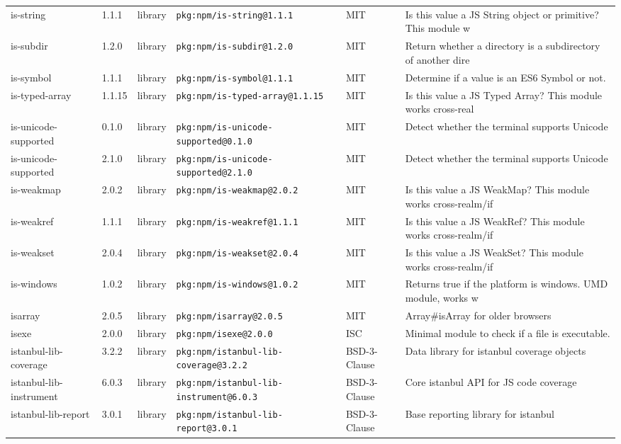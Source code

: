 \documentclass[11pt]{article}
\begin{document}
\begin{longtable}{|l|l|l|p{2.2cm}|l|p{4cm}|}
is-string & 1.1.1 & library & \texttt{pkg:npm/is-string@1.1.1} & MIT & Is this value a JS String object or primitive? This module w \\
is-subdir & 1.2.0 & library & \texttt{pkg:npm/is-subdir@1.2.0} & MIT & Return whether a directory is a subdirectory of another dire \\
is-symbol & 1.1.1 & library & \texttt{pkg:npm/is-symbol@1.1.1} & MIT & Determine if a value is an ES6 Symbol or not. \\
is-typed-array & 1.1.15 & library & \texttt{pkg:npm/is-typed-array@1.1.15} & MIT & Is this value a JS Typed Array? This module works cross-real \\
is-unicode-supported & 0.1.0 & library & \texttt{pkg:npm/is-unicode-supported@0.1.0} & MIT & Detect whether the terminal supports Unicode \\
is-unicode-supported & 2.1.0 & library & \texttt{pkg:npm/is-unicode-supported@2.1.0} & MIT & Detect whether the terminal supports Unicode \\
is-weakmap & 2.0.2 & library & \texttt{pkg:npm/is-weakmap@2.0.2} & MIT & Is this value a JS WeakMap? This module works cross-realm/if \\
is-weakref & 1.1.1 & library & \texttt{pkg:npm/is-weakref@1.1.1} & MIT & Is this value a JS WeakRef? This module works cross-realm/if \\
is-weakset & 2.0.4 & library & \texttt{pkg:npm/is-weakset@2.0.4} & MIT & Is this value a JS WeakSet? This module works cross-realm/if \\
is-windows & 1.0.2 & library & \texttt{pkg:npm/is-windows@1.0.2} & MIT & Returns true if the platform is windows. UMD module, works w \\
isarray & 2.0.5 & library & \texttt{pkg:npm/isarray@2.0.5} & MIT & Array\#isArray for older browsers \\
isexe & 2.0.0 & library & \texttt{pkg:npm/isexe@2.0.0} & ISC & Minimal module to check if a file is executable. \\
istanbul-lib-coverage & 3.2.2 & library & \texttt{pkg:npm/istanbul-lib-coverage@3.2.2} & BSD-3-Clause & Data library for istanbul coverage objects \\
istanbul-lib-instrument & 6.0.3 & library & \texttt{pkg:npm/istanbul-lib-instrument@6.0.3} & BSD-3-Clause & Core istanbul API for JS code coverage \\
istanbul-lib-report & 3.0.1 & library & \texttt{pkg:npm/istanbul-lib-report@3.0.1} & BSD-3-Clause & Base reporting library for istanbul \\

\end{longtable}
\end{document}
